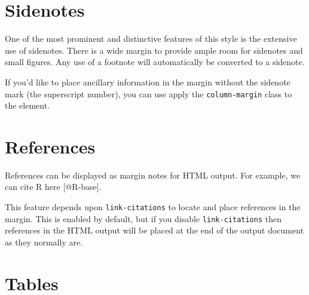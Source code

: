 \documentclass[
  letterpaper,
  DIV=11,
  numbers=noendperiod,
  oneside]{scrartcl}
\begin{document}
\section{Sidenotes}\label{sidenotes}

One of the most prominent and distinctive features of this style is the
extensive use of sidenotes. There is a wide margin to provide ample room
for sidenotes and small figures. Any use of a footnote will
automatically be converted to a sidenote.

{} If you'd like to place ancillary
information in the margin without the sidenote mark (the superscript
number), you can use apply the \texttt{column-margin} class to the
element.

\section{References}\label{references}

References can be displayed as margin notes for HTML output. For
example, we can cite R here {[}@R-base{]}.

\begin{tcolorbox}[enhanced jigsaw, arc=.35mm, colback=white, left=2mm, breakable, colframe=quarto-callout-note-color-frame, bottomrule=.15mm, toprule=.15mm, rightrule=.15mm, opacityback=0, leftrule=.75mm]
\begin{minipage}[t]{5.5mm}
\textcolor{quarto-callout-note-color}{\faInfo}
\end{minipage}%
\begin{minipage}[t]{\textwidth - 5.5mm}

This feature depends upon \texttt{link-citations} to locate and place
references in the margin. This is enabled by default, but if you disable
\texttt{link-citations} then references in the HTML output will be
placed at the end of the output document as they normally are.

\end{minipage}%
\end{tcolorbox}

\section{Tables}\label{tables}
\end{document}

